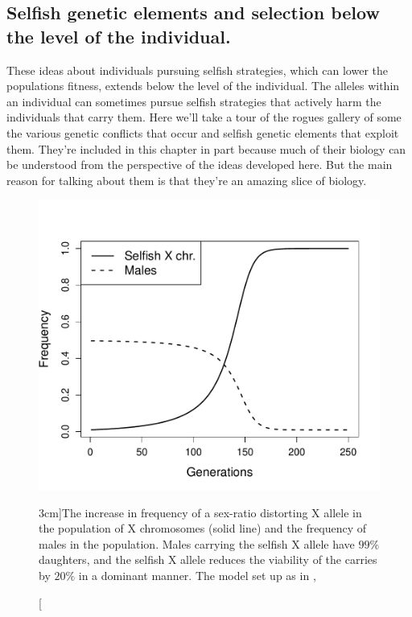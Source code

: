 {%


\subsection{Selfish genetic elements and selection below the level of
  the individual.}

These ideas about individuals pursuing selfish strategies, which can
lower the populations fitness, extends below the level of the individual. The alleles within an
individual can sometimes pursue selfish strategies that
actively harm the individuals that carry them. Here we'll take a tour
of the rogues gallery of some the various
genetic conflicts that occur and selfish genetic elements that exploit
them. They're included in this chapter in part because much of their biology can
be understood from the perspective of the ideas developed here. But the main reason for talking about them is that they're an
amazing slice of biology. %
\begin{figure}
\begin{center}
\includegraphics[width= \textwidth]{figures/sex_ratio_distortor.pdf}

\end{center}
\caption[][3cm]{The increase in frequency of a sex-ratio distorting X allele in the population of
  X chromosomes (solid line) and the frequency of males in the
  population. Males carrying the selfish X allele have $99\%$
  daughters, and the selfish X allele reduces the viability of the
  carries by $20\%$ in a dominant manner. The model set up as in \citet{edwards1961population}, } \label{fig:selfish_X_freqs}
\end{figure}


}

